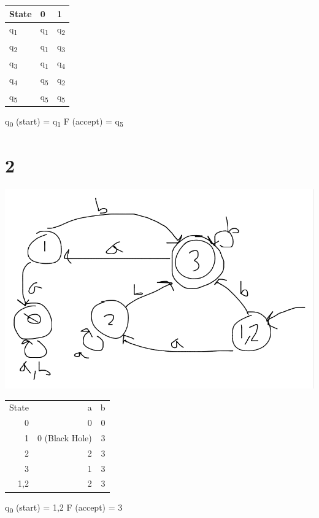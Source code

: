 \documentclass[11pt]{article}
\begin{document}
\begin{center}
\begin{tabular}{l|l|l}
State & 0 & 1\\
\hline
q\textsubscript{1} & q\textsubscript{1} & q\textsubscript{2}\\
q\textsubscript{2} & q\textsubscript{1} & q\textsubscript{3}\\
q\textsubscript{3} & q\textsubscript{1} & q\textsubscript{4}\\
q\textsubscript{4} & q\textsubscript{5} & q\textsubscript{2}\\
q\textsubscript{5} & q\textsubscript{5} & q\textsubscript{5}\\
\end{tabular}
\end{center}
q\textsubscript{0} (start) = q\textsubscript{1}
F (accept) = q\textsubscript{5}
\section{2}
\label{sec:org17b8d96}
\begin{center}
\includegraphics[width=.9\linewidth]{2.png}
\end{center}
\begin{center}
\begin{tabular}{r|r|r}
State & a & b\\
0 & 0 & 0\\
1 & 0 (Black Hole) & 3\\
2 & 2 & 3\\
3 & 1 & 3\\
1,2 & 2 & 3\\
\end{tabular}
\end{center}
q\textsubscript{0} (start) = 1,2
F (accept) = 3
\end{document}
